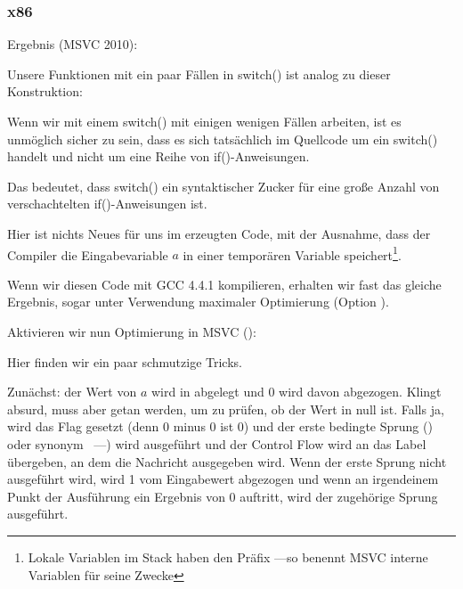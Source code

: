 \subsubsection{x86}


Ergebnis (MSVC 2010):


Unsere Funktionen mit ein paar Fällen in switch() ist analog zu dieser Konstruktion:



Wenn wir mit einem switch() mit einigen wenigen Fällen arbeiten, ist es unmöglich sicher zu sein, dass es sich
tatsächlich im Quellcode um ein switch() handelt und nicht um eine Reihe von if()-Anweisungen.

\myindex{\SyntacticSugar}
Das bedeutet, dass switch() ein syntaktischer Zucker für eine große Anzahl von verschachtelten if()-Anweisungen ist.

Hier ist nichts Neues für uns im erzeugten Code, mit der Ausnahme, dass der Compiler die Eingabevariable $a$ in einer
temporären Variable  speichert\footnote{Lokale Variablen im Stack haben den Präfix ---so benennt MSVC
interne Variablen für seine Zwecke}.

Wenn wir diesen Code mit GCC 4.4.1 kompilieren, erhalten wir fast das gleiche Ergebnis, sogar unter Verwendung maximaler
Optimierung (Option \Othree).


Aktivieren wir nun Optimierung in MSVC (\Ox): 

\label{JMP_instead_of_RET}

Hier finden wir ein paar schmutzige Tricks.

Zunächst: der Wert von $a$ wird in \EAX abgelegt und 0 wird davon abgezogen. Klingt absurd, muss aber getan werden, um
zu prüfen, ob der Wert in \EAX null ist. Falls ja, wird das \ZF Flag gesetzt (denn 0 minus 0 ist 0) und der erste
bedingte Sprung \JE () oder synonym \JZ~---) wird ausgeführt und der Control Flow
wird an das Label  übergeben, an dem die Nachricht  ausgegeben wird.
Wenn der erste Sprung nicht ausgeführt wird, wird 1 vom Eingabewert abgezogen und wenn an irgendeinem Punkt der
Ausführung ein Ergebnis von 0 auftritt, wird der zugehörige Sprung ausgeführt. 

